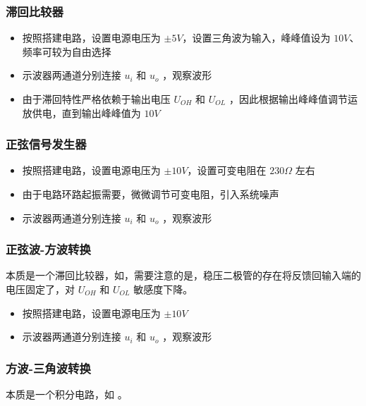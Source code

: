 \documentclass[lang=cn,11pt,a4paper,cite=authoryear]{elegantpaper}
\begin{document}
\subsubsection{滞回比较器}

\begin{itemize}
    \item 按照搭建电路，设置电源电压为 \(\pm 5 V\)，设置三角波为输入，峰峰值设为 \(10 V\)、频率可较为自由选择
    \item 示波器两通道分别连接 \(u_i\) 和 \(u_o\) ，观察波形
    \item 由于滞回特性严格依赖于输出电压 \(U_{OH}\) 和 \(U_{OL}\) ，因此根据输出峰峰值调节运放供电，直到输出峰峰值为 \(10 V\)
\end{itemize}


\subsubsection{正弦信号发生器}

\begin{itemize}
    \item 按照搭建电路，设置电源电压为 \(\pm 10 V\)，设置可变电阻在 \(230 \Omega\) 左右
    \item 由于电路环路起振需要，微微调节可变电阻，引入系统噪声
    \item 示波器两通道分别连接 \(u_i\) 和 \(u_o\) ，观察波形
\end{itemize}


\subsubsection{正弦波-方波转换}

本质是一个滞回比较器，如，需要注意的是，稳压二极管的存在将反馈回输入端的电压固定了，对 \(U_{OH}\) 和 \(U_{OL}\) 敏感度下降。

\begin{itemize}
    \item 按照搭建电路，设置电源电压为 \(\pm 10 V\)
    \item 示波器两通道分别连接 \(u_i\) 和 \(u_o\) ，观察波形
\end{itemize}

\subsubsection{方波-三角波转换}

本质是一个积分电路，如 。
\end{document}
